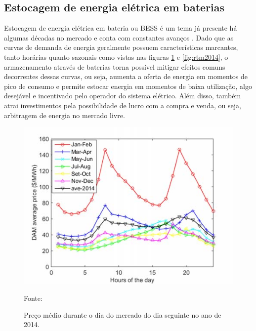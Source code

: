 \subsection{Estocagem de energia elétrica em baterias}
Estocagem de energia elétrica em bateria ou \ac{BESS} é um tema já presente há algumas décadas no mercado e conta com constantes avanços \cite{Doughty2010}. Dado que as curvas de demanda de energia geralmente possuem características marcantes, tanto horárias quanto sazonais como vistas nas figuras \ref{fig:dam2014} e \ref{fig:rtm2014}, o armazenamento através de baterias torna possível mitigar efeitos comuns decorrentes dessas curvas, ou seja, aumenta a oferta de energia em momentos de pico de consumo e permite estocar energia em momentos de baixa utilização, algo desejável e incentivado pelo operador do sistema elétrico. Além disso, também atrai investimentos pela possibilidade de lucro com a compra e venda, ou seja, arbitragem de energia no mercado livre.
\begin{figure}[htb]
	\caption{Preço médio durante o dia do mercado do dia seguinte no ano de 2014.}
	\begin{center}
	    \includegraphics[scale=.6]{figuras/dam-hourly-2014.png}
	\end{center}
   \begin{center}
      \footnotesize {Fonte: }
   \end{center}
    \label{fig:dam2014}
\end{figure}
